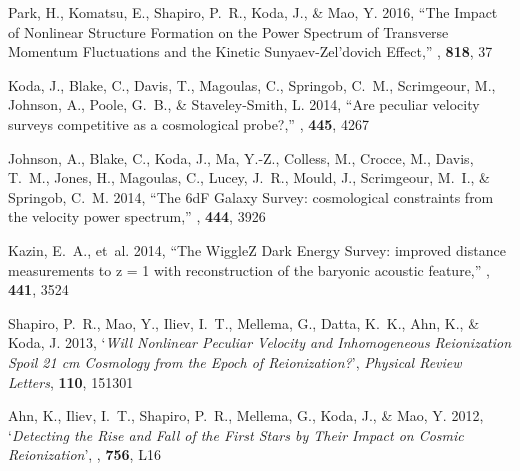 \begin{thebibliography}{8}
{Park}, H., {Komatsu}, E., {Shapiro}, P.~R., {Koda}, J., \& {Mao}, Y. 2016,
  ``{The Impact of Nonlinear Structure Formation on the Power Spectrum of
  Transverse Momentum Fluctuations and the Kinetic Sunyaev-Zel'dovich
  Effect},'' {\em \apj\/}, {\bf 818}, 37

{Koda}, J., {Blake}, C., {Davis}, T., {Magoulas}, C., {Springob}, C.~M.,
  {Scrimgeour}, M., {Johnson}, A., {Poole}, G.~B., \& {Staveley-Smith}, L.
  2014, ``{Are peculiar velocity surveys competitive as a cosmological
  probe?},'' {\em \mnras\/}, {\bf 445}, 4267

{Johnson}, A., {Blake}, C., {Koda}, J., {Ma}, Y.-Z., {Colless}, M., {Crocce},
  M., {Davis}, T.~M., {Jones}, H., {Magoulas}, C., {Lucey}, J.~R., {Mould}, J.,
  {Scrimgeour}, M.~I., \& {Springob}, C.~M. 2014, ``{The 6dF Galaxy Survey:
  cosmological constraints from the velocity power spectrum},'' {\em \mnras\/},
  {\bf 444}, 3926

{Kazin}, E.~A., {et~al.} 2014, ``{The WiggleZ Dark Energy Survey: improved
  distance measurements to z = 1 with reconstruction of the baryonic acoustic
  feature},'' {\em \mnras\/}, {\bf 441}, 3524

{Shapiro}, P.~R., {Mao}, Y., {Iliev}, I.~T., {Mellema}, G., {Datta}, K.~K.,
  {Ahn}, K., \& {Koda}, J. 2013, `{\it Will Nonlinear Peculiar Velocity and
  Inhomogeneous Reionization Spoil 21 cm Cosmology from the Epoch of
  Reionization?}', {\em Physical Review Letters\/}, {\bf 110}, 151301

{Ahn}, K., {Iliev}, I.~T., {Shapiro}, P.~R., {Mellema}, G., {Koda}, J., \&
  {Mao}, Y. 2012, `{\it Detecting the Rise and Fall of the First Stars by Their
  Impact on Cosmic Reionization}', {\em \apjl\/}, {\bf 756}, L16


\end{thebibliography}
